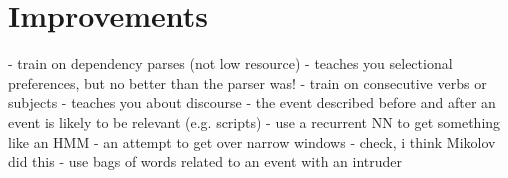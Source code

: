 \documentclass[11pt,letterpaper]{article}
\begin{document}
\section{Improvements}
- train on dependency parses (not low resource)
	- teaches you selectional preferences, but no better than the parser was!
- train on consecutive verbs or subjects
	- teaches you about discourse
	- the event described before and after an event is likely to be relevant (e.g. scripts)
- use a recurrent NN to get something like an HMM
	- an attempt to get over narrow windows
	- check, i think Mikolov did this
- use bags of words related to an event with an intruder




{}

\end{document}
